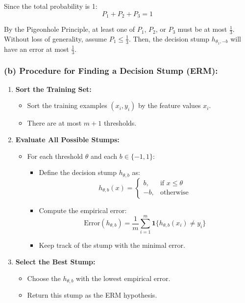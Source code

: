 \documentclass{article}
\begin{document}
Since the total probability is 1:
\[
P_1 + P_2 + P_3 = 1
\]

By the Pigeonhole Principle, at least one of \(P_1\), \(P_2\), or \(P_3\) must be at most \(\frac{1}{3}\). Without loss of generality, assume \(P_1 \leq \frac{1}{3}\). Then, the decision stump \(h_{\theta_1, -b}\) will have an error at most \(\frac{1}{3}\).

\subsubsection*{(b) Procedure for Finding a Decision Stump (ERM):}

\begin{enumerate}
    \item \textbf{Sort the Training Set:}
    \begin{itemize}
        \item Sort the training examples \((x_i, y_i)\) by the feature values \(x_i\).
        \item There are at most \(m + 1\) thresholds.
    \end{itemize}
    \item \textbf{Evaluate All Possible Stumps:}
    \begin{itemize}
        \item For each threshold \(\theta\) and each \(b \in \{-1, 1\}\):
        \begin{itemize}
            \item Define the decision stump \(h_{\theta, b}\) as:
            \[
            h_{\theta, b}(x) = \begin{cases}
            b, & \text{if } x \leq \theta \\
            -b, & \text{otherwise}
            \end{cases}
            \]
            \item Compute the empirical error:
            \[
            \text{Error}(h_{\theta, b}) = \frac{1}{m} \sum_{i=1}^m \mathbf{1}\{h_{\theta, b}(x_i) \neq y_i\}
            \]
            \item Keep track of the stump with the minimal error.
        \end{itemize}
    \end{itemize}
    \item \textbf{Select the Best Stump:}
    \begin{itemize}
        \item Choose the \(h_{\theta, b}\) with the lowest empirical error.
        \item Return this stump as the ERM hypothesis.
    \end{itemize}
\end{enumerate}
\end{document}

